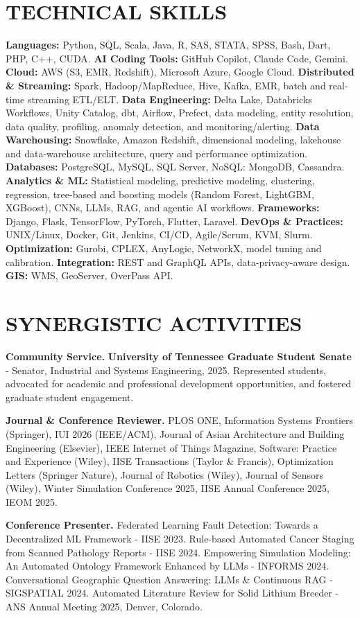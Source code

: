 \documentclass[10pt, letterpaper]{article}
\begin{document}
\section{TECHNICAL SKILLS}
\noindent\textbf{Languages:} Python, SQL, Scala, Java, R, SAS, STATA, SPSS, Bash, Dart, PHP, C++, CUDA.
\textbf{AI Coding Tools:} GitHub Copilot, Claude Code, Gemini.
\textbf{Cloud:} AWS (S3, EMR, Redshift), Microsoft Azure, Google Cloud.
\textbf{Distributed \& Streaming:} Spark, Hadoop/MapReduce, Hive, Kafka, EMR, batch and real-time streaming ETL/ELT.
\textbf{Data Engineering:} Delta Lake, Databricks Workflows, Unity Catalog, dbt, Airflow, Prefect, data modeling, entity resolution, data quality, profiling, anomaly detection, and monitoring/alerting.
\textbf{Data Warehousing:} Snowflake, Amazon Redshift, dimensional modeling, lakehouse and data-warehouse architecture, query and performance optimization.
\textbf{Databases:} PostgreSQL, MySQL, SQL Server, NoSQL: MongoDB, Cassandra.
\textbf{Analytics \& ML:} Statistical modeling, predictive modeling, clustering, regression, tree-based and boosting models (Random Forest, LightGBM, XGBoost), CNNs, LLMs, RAG, and agentic AI workflows.
\textbf{Frameworks:} Django, Flask, TensorFlow, PyTorch, Flutter, Laravel.
\textbf{DevOps \& Practices:} UNIX/Linux, Docker, Git, Jenkins, CI/CD, Agile/Scrum, KVM, Slurm.
\textbf{Optimization:} Gurobi, CPLEX, AnyLogic, NetworkX, model tuning and calibration.
\textbf{Integration:} REST and GraphQL APIs, data-privacy-aware design.
\textbf{GIS:} WMS, GeoServer, OverPass API.


\section{SYNERGISTIC ACTIVITIES}
\small

\noindent\textbf{Community Service.}
\textbf{University of Tennessee Graduate Student Senate} - Senator, Industrial and Systems Engineering, 2025. Represented students, advocated for academic and professional development opportunities, and fostered graduate student engagement.

\vspace{0.3em}
\noindent\textbf{Journal \& Conference Reviewer.}
PLOS ONE, Information Systems Frontiers (Springer), IUI 2026 (IEEE/ACM), Journal of Asian Architecture and Building Engineering (Elsevier), IEEE Internet of Things Magazine, Software: Practice and Experience (Wiley), IISE Transactions (Taylor \& Francis), Optimization Letters (Springer Nature), Journal of Robotics (Wiley), Journal of Sensors (Wiley), Winter Simulation Conference 2025, IISE Annual Conference 2025, IEOM 2025.

\vspace{0.3em}
\noindent\textbf{Conference Presenter.}
Federated Learning Fault Detection: Towards a Decentralized ML Framework - IISE 2023.
Rule-based Automated Cancer Staging from Scanned Pathology Reports - IISE 2024.
Empowering Simulation Modeling: An Automated Ontology Framework Enhanced by LLMs - INFORMS 2024.
Conversational Geographic Question Answering: LLMs \& Continuous RAG - SIGSPATIAL 2024.
Automated Literature Review for Solid Lithium Breeder - ANS Annual Meeting 2025, Denver, Colorado.
\end{document}
